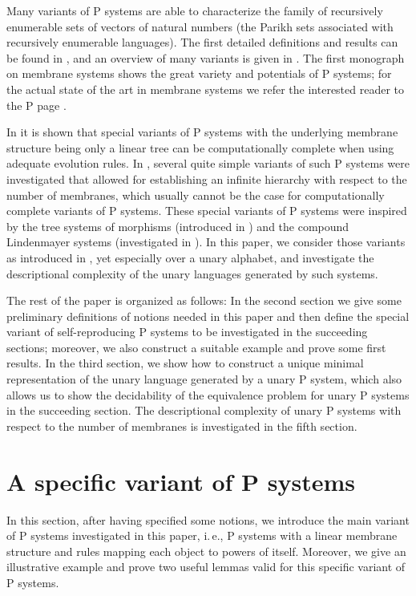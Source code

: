 \documentclass[copyright]{eptcs}
\begin{document}
Many variants of P systems are able to characterize the family of
recursively enumerable sets of vectors of natural numbers (the Parikh sets
associated with recursively enumerable languages). The first detailed
definitions and results can be found in \cite{Paun1998}, and an overview of
many variants is given in \cite{PaunRozenberg2002}. The first monograph on
membrane systems \cite{Paunbook2002} shows the great variety and potentials
of P systems; for the actual state of the art in membrane systems we refer
the interested reader to the P page \cite{Ppage}.

In \cite{Paunetal2002} it is shown that special variants of P systems with
the underlying membrane structure being only a linear tree can be
computationally complete when using adequate evolution rules. In \cite {Freund2001}, several quite simple variants of such P systems were
investigated that allowed for establishing an infinite hierarchy with
respect to the number of membranes, which usually cannot be the case for
computationally complete variants of P systems. These special variants of P
systems were inspired by the tree systems of morphisms (introduced in \cite {Dassowetal2001}) and the compound Lindenmayer systems (investigated in \cite {Dassow1986}). In this paper, we consider those variants as introduced in 
\cite{Freund2001}, yet especially over a unary alphabet, and investigate the
descriptional complexity of the unary languages generated by such systems.

\medskip

The rest of the paper is organized as follows: In the second section we give
some preliminary definitions of notions needed in this paper and then define
the special variant of self-reproducing P systems to be investigated in the
succeeding sections; moreover, we also construct a suitable example and
prove some first results. In the third section, we show how to construct a
unique minimal representation of the unary language generated by a unary P
system, which also allows us to show the decidability of the equivalence
problem for unary P systems in the succeeding section. The descriptional
complexity of unary P systems with respect to the number of membranes is
investigated in the fifth section.

\section{A specific variant of P systems}

In this section, after having specified some notions, we introduce the main
variant of P systems investigated in this paper, i.\,e., P systems with a
linear membrane structure and rules mapping each object to powers of itself.
Moreover, we give an illustrative example and prove two useful lemmas valid
for this specific variant of P systems.
\end{document}
